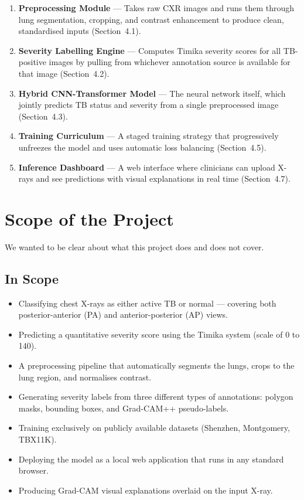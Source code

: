 \documentclass[12pt]{report}
\begin{document}
\begin{enumerate}
    \item \textbf{Preprocessing Module} --- Takes raw CXR images and runs them through lung segmentation, cropping, and contrast enhancement to produce clean, standardised inputs (Section~4.1).
    \item \textbf{Severity Labelling Engine} --- Computes Timika severity scores for all TB-positive images by pulling from whichever annotation source is available for that image (Section~4.2).
    \item \textbf{Hybrid CNN-Transformer Model} --- The neural network itself, which jointly predicts TB status and severity from a single preprocessed image (Section~4.3).
    \item \textbf{Training Curriculum} --- A staged training strategy that progressively unfreezes the model and uses automatic loss balancing (Section~4.5).
    \item \textbf{Inference Dashboard} --- A web interface where clinicians can upload X-rays and see predictions with visual explanations in real time (Section~4.7).
\end{enumerate}

\section{Scope of the Project}

We wanted to be clear about what this project does and does not cover.

\subsection{In Scope}
\begin{itemize}
    \item Classifying chest X-rays as either active TB or normal --- covering both posterior-anterior (PA) and anterior-posterior (AP) views.
    \item Predicting a quantitative severity score using the Timika system (scale of 0 to 140).
    \item A preprocessing pipeline that automatically segments the lungs, crops to the lung region, and normalises contrast.
    \item Generating severity labels from three different types of annotations: polygon masks, bounding boxes, and Grad-CAM++ pseudo-labels.
    \item Training exclusively on publicly available datasets (Shenzhen, Montgomery, TBX11K).
    \item Deploying the model as a local web application that runs in any standard browser.
    \item Producing Grad-CAM visual explanations overlaid on the input X-ray.
\end{itemize}
\end{document}
